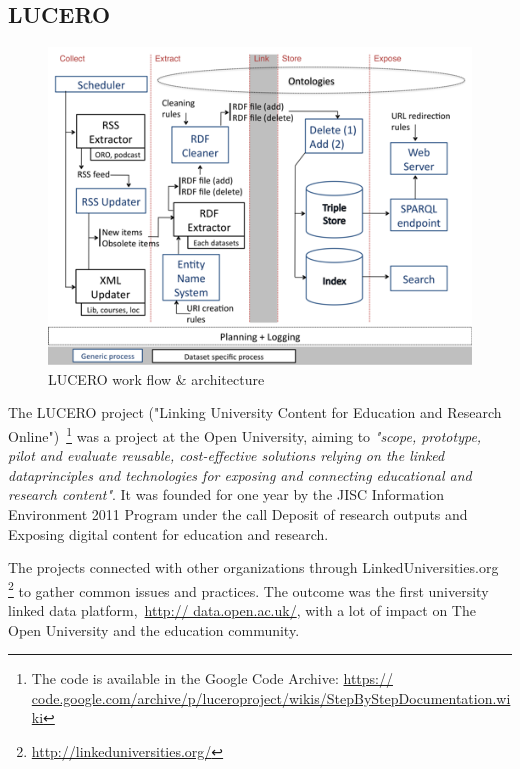 \subsection{LUCERO}


\begin{figure}[htbp]
	\centering
\includegraphics[width=\textwidth]{img/lucero_architecture.png}
	\caption{LUCERO work flow \& architecture}
	\label{lucero_architecture}
\end{figure}

The LUCERO project ("Linking University Content for Education and Research 
Online")~\footnote{The code is available in the Google Code Archive: \url{https://
code.google.com/archive/p/luceroproject/wikis/StepByStepDocumentation.wiki}} was a 
project at the Open University, aiming to \emph{"scope, prototype, pilot and 
evaluate reusable, cost-effective solutions relying on the linked dataprinciples 
and technologies for exposing and connecting educational and research content"}. 
It was founded for one year by the JISC Information Environment 2011 Program under 
the call Deposit of research outputs and Exposing digital content for education 
and research.~\cite{lucero:about}

The projects connected with other organizations through LinkedUniversities.org~
\footnote{\url{http://linkeduniversities.org/}} to gather common issues and 
practices. The outcome was the first university linked data platform,~\url{http://
data.open.ac.uk/}, with a lot of impact on The Open University and the education 
community.

